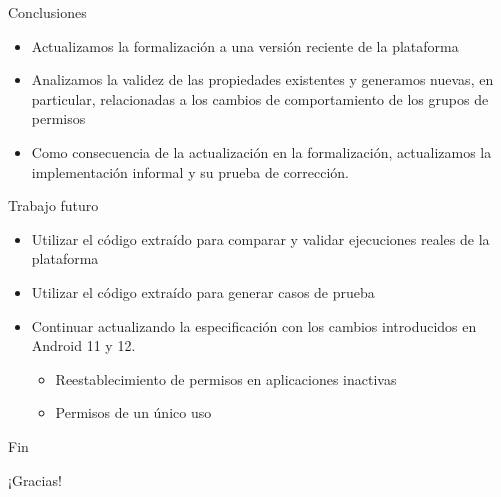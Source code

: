 \documentclass[pdf, handout]{beamer} %
\begin{document}
\begin{frame}{Conclusiones}
    \begin{itemize}[<+->]
        \item Actualizamos la formalización a una versión reciente de la plataforma
        \item Analizamos la validez de las propiedades existentes y generamos nuevas, en particular,
              relacionadas a los cambios de comportamiento de los grupos de permisos
        \item Como consecuencia de la actualización en la formalización, actualizamos la
              implementación informal  y su prueba de corrección.
    \end{itemize}
\end{frame}

\begin{frame}{Trabajo futuro}
    \begin{itemize}[<+->]
        \item Utilizar el código extraído para comparar y validar ejecuciones reales de la
              plataforma
        \item Utilizar el código extraído para generar casos de prueba
        \item Continuar actualizando la especificación con los cambios introducidos en Android 11 y
              12.
              \begin{itemize}
                  \item Reestablecimiento de permisos en aplicaciones inactivas
                  \item Permisos de un único uso
              \end{itemize}
    \end{itemize}
\end{frame}

\begin{frame}{Fin}
    \begin{center}
        \huge¡Gracias!
    \end{center}
\end{frame}
\end{document}
